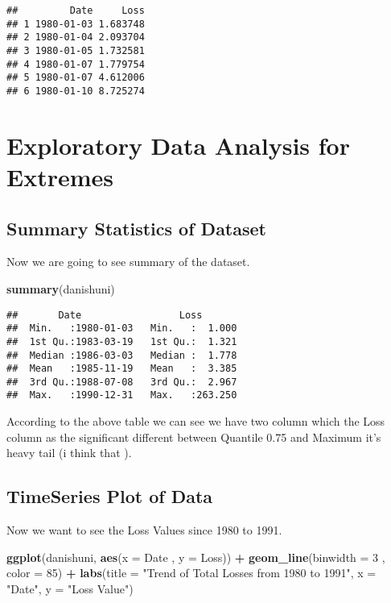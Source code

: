 \documentclass[
  12pt,
]{article}
\newenvironment{Shaded}{\begin{snugshade}}{\end{snugshade}}
\newcommand{\AttributeTok}[1]{\textcolor[rgb]{0.13,0.29,0.53}{#1}}
\newcommand{\DecValTok}[1]{\textcolor[rgb]{0.00,0.00,0.81}{#1}}
\newcommand{\FunctionTok}[1]{\textcolor[rgb]{0.13,0.29,0.53}{\textbf{#1}}}
\newcommand{\NormalTok}[1]{#1}
\newcommand{\SpecialCharTok}[1]{\textcolor[rgb]{0.81,0.36,0.00}{\textbf{#1}}}
\newcommand{\StringTok}[1]{\textcolor[rgb]{0.31,0.60,0.02}{#1}}
\begin{document}
\begin{verbatim}
##         Date     Loss
## 1 1980-01-03 1.683748
## 2 1980-01-04 2.093704
## 3 1980-01-05 1.732581
## 4 1980-01-07 1.779754
## 5 1980-01-07 4.612006
## 6 1980-01-10 8.725274
\end{verbatim}

\section{Exploratory Data Analysis for
Extremes}\label{exploratory-data-analysis-for-extremes}

\subsection{Summary Statistics of
Dataset}\label{summary-statistics-of-dataset}

Now we are going to see summary of the dataset.

\begin{Shaded}
\begin{Highlighting}[]
\FunctionTok{summary}\NormalTok{(danishuni)}
\end{Highlighting}
\end{Shaded}

\begin{verbatim}
##       Date                 Loss        
##  Min.   :1980-01-03   Min.   :  1.000  
##  1st Qu.:1983-03-19   1st Qu.:  1.321  
##  Median :1986-03-03   Median :  1.778  
##  Mean   :1985-11-19   Mean   :  3.385  
##  3rd Qu.:1988-07-08   3rd Qu.:  2.967  
##  Max.   :1990-12-31   Max.   :263.250
\end{verbatim}

According to the above table we can see we have two column which the
Loss column as the significant different between Quantile 0.75 and
Maximum it's heavy tail (i think that ).

\subsection{TimeSeries Plot of Data}\label{timeseries-plot-of-data}

Now we want to see the Loss Values since 1980 to 1991.

\begin{Shaded}
\begin{Highlighting}[]
\FunctionTok{ggplot}\NormalTok{(danishuni, }\FunctionTok{aes}\NormalTok{(}\AttributeTok{x =}\NormalTok{ Date , }\AttributeTok{y =}\NormalTok{ Loss)) }\SpecialCharTok{+}
  \FunctionTok{geom\_line}\NormalTok{(}\AttributeTok{binwidth =} \DecValTok{3}\NormalTok{ , }\AttributeTok{color =} \DecValTok{85}\NormalTok{) }\SpecialCharTok{+}
  \FunctionTok{labs}\NormalTok{(}\AttributeTok{title =} \StringTok{"Trend of Total Losses from 1980 to 1991"}\NormalTok{, }\AttributeTok{x =} \StringTok{"Date"}\NormalTok{, }\AttributeTok{y =} \StringTok{"Loss Value"}\NormalTok{)}
\end{Highlighting}
\end{Shaded}
\end{document}
